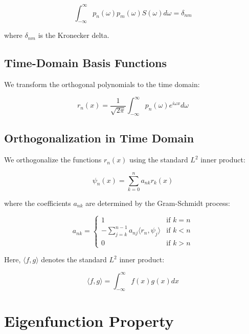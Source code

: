 \documentclass{article}
\begin{document}
\begin{equation}
\int_{-\infty}^{\infty} p_n(\omega) p_m(\omega) S(\omega) d\omega = \delta_{nm}
\end{equation}

where $\delta_{nm}$ is the Kronecker delta.

\subsection{Time-Domain Basis Functions}

We transform the orthogonal polynomials to the time domain:

\begin{equation}
r_n(x) = \frac{1}{\sqrt{2\pi}} \int_{-\infty}^{\infty} p_n(\omega) e^{i\omega x} d\omega
\end{equation}

\subsection{Orthogonalization in Time Domain}

We orthogonalize the functions $r_n(x)$ using the standard $L^2$ inner product:

\begin{equation}
\psi_n(x) = \sum_{k=0}^n a_{nk} r_k(x)
\end{equation}

where the coefficients $a_{nk}$ are determined by the Gram-Schmidt process:

\begin{equation}
a_{nk} = \begin{cases}
1 & \text{if } k = n \\
-\sum_{j=k}^{n-1} a_{nj} \langle r_n, \psi_j \rangle & \text{if } k < n \\
0 & \text{if } k > n
\end{cases}
\end{equation}

Here, $\langle f, g \rangle$ denotes the standard $L^2$ inner product:

\begin{equation}
\langle f, g \rangle = \int_{-\infty}^{\infty} f(x) g(x) dx
\end{equation}

\section{Eigenfunction Property}
\end{document}
